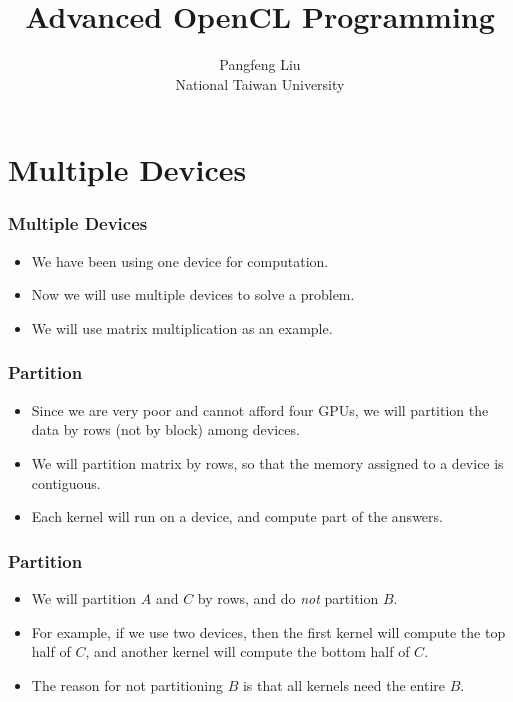 \documentclass{beamer}
\begin{document}
\title{Advanced OpenCL Programming}

\author{Pangfeng Liu \\ National Taiwan University}

\begin{frame}
  \titlepage
\end{frame}


\section{Multiple Devices}

\begin{frame}
  \frametitle{Multiple Devices}
  \begin{itemize}
    \item We have been using one device for computation. 
    \item Now we will use multiple devices to solve a problem.
    \item We will use matrix multiplication as an example.
  \end{itemize}
\end{frame}

\begin{frame}
  \frametitle{Partition}
  \begin{itemize}
    \item Since we are very poor and cannot afford four GPUs, we will
      partition the data by rows (not by block) among devices.  
    \item We will partition matrix by rows, so that the memory
      assigned to a device is contiguous.
    \item Each kernel will run on a device, and compute part of the
      answers.
  \end{itemize}
\end{frame}

\begin{frame}
  \frametitle{Partition}
  \begin{itemize}
    \item We will partition $A$ and $C$ by rows, and do {\em not}
      partition $B$.
    \item For example, if we use two devices, then the first kernel
      will compute the top half of $C$, and another kernel will
      compute the bottom half of $C$.
      \item The reason for not partitioning $B$ is that all kernels
        need the entire $B$.
  \end{itemize}
\end{frame}
\end{document}

